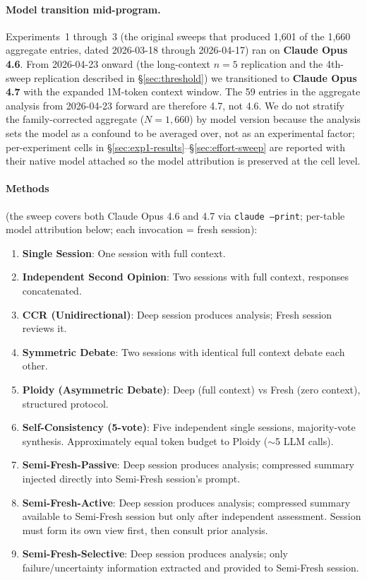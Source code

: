 \documentclass[11pt]{article}
\begin{document}
\paragraph{Model transition mid-program.} Experiments~1 through~3 (the original sweeps that produced 1{,}601 of the 1{,}660 aggregate entries, dated 2026-03-18 through 2026-04-17) ran on \textbf{Claude Opus 4.6}. From 2026-04-23 onward (the long-context $n{=}5$ replication and the 4th-sweep replication described in \S\ref{sec:threshold}) we transitioned to \textbf{Claude Opus 4.7} with the expanded 1M-token context window. The 59 entries in the aggregate analysis from 2026-04-23 forward are therefore 4.7, not 4.6. We do not stratify the family-corrected aggregate ($N{=}1{,}660$) by model version because the analysis sets the model as a confound to be averaged over, not as an experimental factor; per-experiment cells in \S\ref{sec:exp1-results}--\S\ref{sec:effort-sweep} are reported with their native model attached so the model attribution is preserved at the cell level.

\paragraph{Methods} (the sweep covers both Claude Opus 4.6 and 4.7 via \texttt{claude --print}; per-table model attribution below; each invocation = fresh session):
\begin{enumerate}[label=\arabic*., leftmargin=1.5em]
  \item \textbf{Single Session}: One session with full context.
  \item \textbf{Independent Second Opinion}: Two sessions with full context, responses concatenated.
  \item \textbf{CCR (Unidirectional)}: Deep session produces analysis; Fresh session reviews it.
  \item \textbf{Symmetric Debate}: Two sessions with identical full context debate each other.
  \item \textbf{Ploidy (Asymmetric Debate)}: Deep (full context) vs Fresh (zero context), structured protocol.
  \item \textbf{Self-Consistency (5-vote)}: Five independent single sessions, majority-vote synthesis. Approximately equal token budget to Ploidy ($\sim$5 LLM calls).
  \item \textbf{Semi-Fresh-Passive}: Deep session produces analysis; compressed summary injected directly into Semi-Fresh session's prompt.
  \item \textbf{Semi-Fresh-Active}: Deep session produces analysis; compressed summary available to Semi-Fresh session but only after independent assessment. Session must form its own view first, then consult prior analysis.
  \item \textbf{Semi-Fresh-Selective}: Deep session produces analysis; only failure/uncertainty information extracted and provided to Semi-Fresh session.
\end{enumerate}
\end{document}
